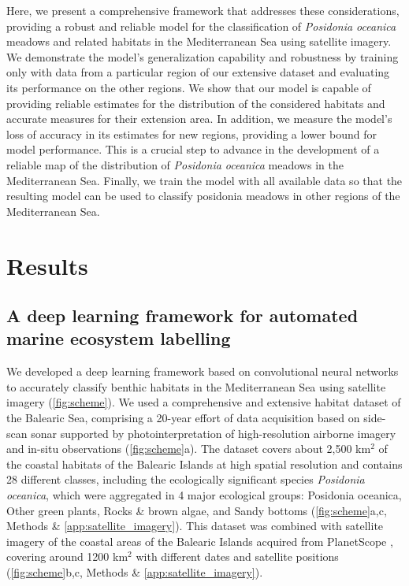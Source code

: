 Here, we present a comprehensive framework that addresses these considerations,
providing a robust and reliable model for the classification of
\textit{Posidonia
    oceanica} meadows and related habitats in the Mediterranean Sea using
satellite imagery. We demonstrate the model's generalization capability and
robustness by training only with data from a particular region of our extensive
dataset and evaluating its performance on the other regions. We show that our
model is capable of providing reliable estimates for the distribution of the
considered habitats and accurate measures for their extension area. In
addition, we measure the model's loss of accuracy in its estimates for new
regions, providing a lower bound for model performance. This is a
crucial step to advance in the development of a reliable map of the
distribution of \textit{Posidonia oceanica} meadows in the Mediterranean Sea.
Finally, we train the model with all available data so that the resulting
model can be used to classify posidonia meadows in other regions of the
Mediterranean Sea.

\section{Results}

\subsection{A deep learning framework for automated marine ecosystem
    labelling}

We developed a deep learning framework based on convolutional neural networks
to accurately classify benthic habitats in the Mediterranean Sea using
satellite imagery (\cref{fig:scheme}). We used a comprehensive and extensive
habitat dataset of the Balearic Sea, comprising a 20-year effort of data
acquisition based on side-scan sonar supported by photointerpretation of
high-resolution airborne imagery and in-situ observations (\cref{fig:scheme}a).
The dataset covers  about 2,500 km$^2$ of the coastal habitats of the Balearic
Islands at high spatial resolution and contains 28 different classes,
including the ecologically significant species \textit{Posidonia
    oceanica}, which were aggregated in 4 major ecological groups: Posidonia
oceanica, Other green plants, Rocks \& brown algae, and Sandy bottoms
(\cref{fig:scheme}a,c, Methods \&  \cref{app:satellite_imagery}). This
dataset was combined with satellite imagery of the coastal areas of the
Balearic Islands acquired from PlanetScope \cite{planet2017}, covering around
1200 km$^2$ with different dates and satellite positions (\cref{fig:scheme}b,c,
Methods \& \cref{app:satellite_imagery}).

